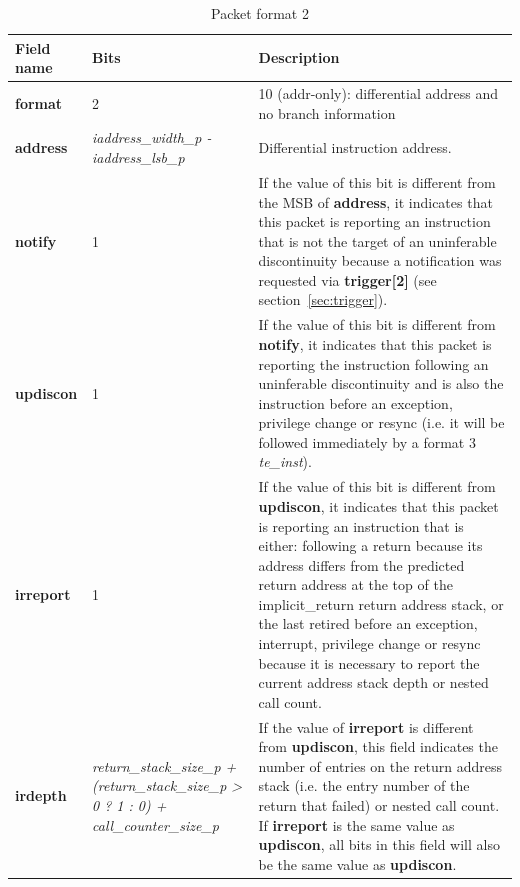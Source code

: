 \begin{table}[!h]
  \centering
  \caption{Packet format 2}
  \label{tab:te_inst2}
  \begin{tabulary}{\textwidth}{|l|p{35mm}|p{90mm}|}
    \hline
    {\bf Field name} & {\bf Bits} & {\bf Description} \\
    \hline
    \textbf{format}	& 2	& 10 (addr-only): differential address and no branch information\\
    \hline
    \textbf{address} & \textit {iaddress\_width\_p - iaddress\_lsb\_p} & 
              Differential instruction address.\\ 
    \hline
    \textbf{notify}	& 1 & 
                If the value of this bit is different from the MSB of \textbf{address}, it indicates that this 
                packet is reporting an instruction that is not the target of an uninferable discontinuity 
                because a notification was requested via \textbf{trigger[2]} (see section~\ref{sec:trigger}). \\
    \hline
    \textbf{updiscon}	& 1 & 
                If the value of this bit is different from \textbf{notify}, it indicates that this 
                packet is reporting the instruction following an uninferable discontinuity and is also the 
                instruction before an exception, privilege change or resync 
                (i.e. it will be followed immediately by a format 3 \textit{te\_inst}).\\
    \hline
    \textbf{irreport}	& 1 & 
                If the value of this bit is different from \textbf{updiscon}, it indicates that this packet is
                reporting an instruction that is either: \newline
                following a return because its address differs from the predicted return address at the top of 
                the implicit\_return return address stack, or \newline
                the last retired before an exception, interrupt, privilege change or resync because it is necessary to report 
                the current address stack depth or nested call count. \\
    \hline
    \textbf{irdepth}	& \textit {return\_stack\_size\_p + (return\_stack\_size\_p > 0 ? 1 : 0) + call\_counter\_size\_p} & 
                If the value of \textbf{irreport} is different from \textbf{updiscon}, this field 
		indicates the number of entries on the return address stack (i.e. the entry number of the return that
                failed) or nested call count.  If \textbf{irreport} is the same value as \textbf{updiscon}, 
                all bits in this field  will also be the same value as \textbf{updiscon}. \\
    \hline
  \end{tabulary}
\end{table}

